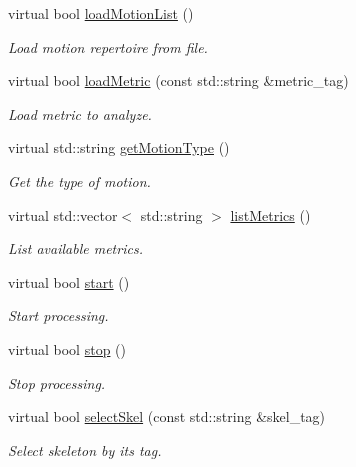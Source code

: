 \begin{DoxyCompactItemize}
\item 
virtual bool \mbox{\hyperlink{classmotionAnalyzer__IDL_af06e1e8fd5ca8bee17ee69e5e61564af}{load\+Motion\+List}} ()
\begin{DoxyCompactList}\small\item\em Load motion repertoire from file. \end{DoxyCompactList}\item 
virtual bool \mbox{\hyperlink{classmotionAnalyzer__IDL_a592816f8515dddcd08fe7e7e87774b16}{load\+Metric}} (const std\+::string \&metric\+\_\+tag)
\begin{DoxyCompactList}\small\item\em Load metric to analyze. \end{DoxyCompactList}\item 
virtual std\+::string \mbox{\hyperlink{classmotionAnalyzer__IDL_ae7b5e18ee6dae046bab1ed59fb9742e4}{get\+Motion\+Type}} ()
\begin{DoxyCompactList}\small\item\em Get the type of motion. \end{DoxyCompactList}\item 
virtual std\+::vector$<$ std\+::string $>$ \mbox{\hyperlink{classmotionAnalyzer__IDL_a139730029d1e7112eb66636c21fe99c8}{list\+Metrics}} ()
\begin{DoxyCompactList}\small\item\em List available metrics. \end{DoxyCompactList}\item 
virtual bool \mbox{\hyperlink{classmotionAnalyzer__IDL_af1a381d5b99e8a14d20b74a6444743f8}{start}} ()
\begin{DoxyCompactList}\small\item\em Start processing. \end{DoxyCompactList}\item 
virtual bool \mbox{\hyperlink{classmotionAnalyzer__IDL_affddad47070a4fdb10357c10037f39f5}{stop}} ()
\begin{DoxyCompactList}\small\item\em Stop processing. \end{DoxyCompactList}\item 
virtual bool \mbox{\hyperlink{classmotionAnalyzer__IDL_a158f8a856611aa5d4bcab9adc9c67a5d}{select\+Skel}} (const std\+::string \&skel\+\_\+tag)
\begin{DoxyCompactList}\small\item\em Select skeleton by its tag. \end{DoxyCompactList}\item 

\end{DoxyCompactItemize}

